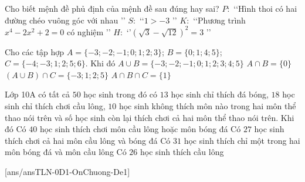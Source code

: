 \begin{ex}%
	Cho biết mệnh đề phủ định của mệnh đề sau đúng hay sai?
	\choiceTF
	{$P\colon$ \lq\lq Hình thoi có hai đường chéo vuông góc với nhau \rq\rq }
	{$S\colon$ \lq\lq $1>-3$ \rq\rq }
	{\True $K\colon$ \lq\lq Phương trình $x^4-2x^2+2=0$ có nghiệm \rq\rq }
	{$H\colon$ \lq\rq $\left(\sqrt{3}-\sqrt{12}\right)^2=3$ \rq\rq}
\end{ex}

\begin{ex}%
	Cho các tập hợp $A=\{-3;-2;-1;0;1;2;3\}$; $B=\{0;1;4;5\}$; $C=\{-4;-3;1;2;5;6\}$. Khi đó
	\choiceTF
	{\True $A\cup B=\{-3;-2;-1;0;1;2;3;4;5\}$}
	{$A\cap B=\{0\}$}
	{\True $(A\cup B)\cap C=\{-3;1;2;5\}$}
	{\True $A\cap B\cap C=\{1\}$}
\end{ex}
\begin{ex}%
	Lớp 10A có tất cả $50$ học sinh trong đó có $13$ học sinh chỉ thích đá bóng, $18$ học sinh chỉ thích chơi cầu lông, $10$ học sinh không thích môn nào trong hai môn thể thao nói trên và số học sinh còn lại thích chơi cả hai môn thể thao nói trên. Khi đó
	\choiceTF
	{\True Có $40$ học sinh thích chơi môn cầu lông hoặc môn bóng đá}
	{Có $27$ học sinh thích chơi cả hai môn cầu lông và bóng đá}
	{\True Có $31$ học sinh thích chỉ một trong hai môn bóng đá và môn cầu lông}
	{Có $26$ học sinh thích cầu lông}
\end{ex}
\TNSA
[ans/ansTLN-0D1-OnChuong-De1]

